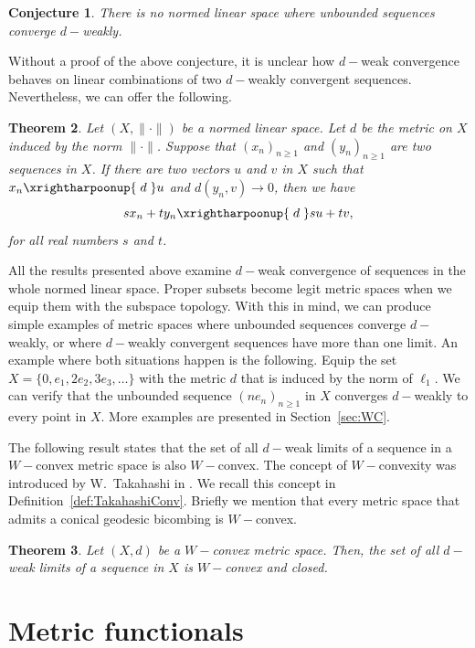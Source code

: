 \documentclass[a4paper,12pt]{article}
\newtheorem{thm}{Theorem}[section]
\newtheorem{conj}[thm]{Conjecture}
\theoremstyle{definition}
\newcommand{\norm}[1]{\lVert#1\rVert}
\numberwithin{equation}{section}
\begin{document}
\begin{conj}
There is no normed linear space where unbounded sequences converge $d-$weakly.
\end{conj}

Without a proof of the above conjecture, it is unclear how $d-$weak convergence 
behaves on linear combinations of two $d-$weakly convergent sequences. 
Nevertheless, we can offer the following.

\begin{thm}\label{thm:dWeakOfLinComb}
Let $(X,\norm{\cdot})$ be a normed linear space. Let $d$ be the metric on $X$ 
induced by the norm $\norm{\cdot}$. Suppose that $(x_n)_{n\geq 1}$ and 
$(y_n)_{n\geq 1}$ are two sequences in $X$. If there are two vectors $u$ and $v$ 
in $X$ such that $x_n \xrightharpoonup{\;d\;} u$ and  $d(y_n,v)\rightarrow 0$, 
then we have
$$
	sx_n + ty_n \xrightharpoonup{\;d\;} su+ tv,
$$
for all real numbers $s$ and $t$. 
\end{thm}

All the results presented above examine $d-$weak convergence of sequences in the 
whole normed linear space. Proper subsets become legit metric spaces when we 
equip them with the subspace topology. With this in mind, we can produce simple 
examples of metric spaces where unbounded sequences converge $d-$weakly, or 
where $d-$weakly convergent sequences have more than one limit. An example where
both situations happen is the following. Equip the set 
$X=\{0,e_1, 2e_2, 3e_3,\dots\}$ with the metric $d$ that is induced by the norm 
of $\ell_1$. We can verify that the unbounded sequence $(ne_n)_{n\geq 1}$ in $X$ 
converges $d-$weakly to every point in $X$. More examples are presented in 
Section~\ref{sec:WC}.

The following result states that the set of all $d-$weak limits of a sequence in
a $W-$convex metric space is also $W-$convex. The concept of $W-$convexity was 
introduced by W.~Takahashi in \cite{Takahashi1970}. We recall this concept in 
Definition~\ref{def:TakahashiConv}. Briefly we mention that every metric space 
that admits a conical geodesic bicombing is $W-$convex.

\begin{thm}\label{thm:dWeakInWconvex}
Let $(X,d)$ be a $W-$convex metric space. Then, the set of all $d-$weak limits of
a sequence in $X$ is $W-$convex and closed.
\end{thm}
 

\section{Metric functionals}\label{sec:MF}
\end{document}
